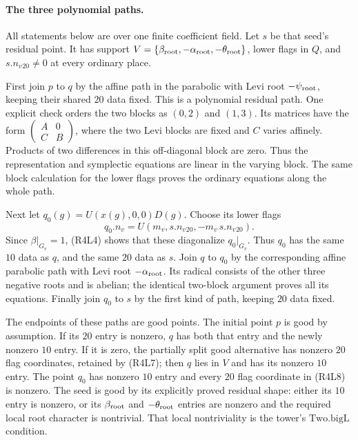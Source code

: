 \paragraph{The three polynomial paths.}
All statements below are over one finite coefficient field.
Let \(s\) be that seed's residual point.
It has support
\(V=\{\beta_{\rm root},-\alpha_{\rm root},
-\theta_{\rm root}\}\), lower flags in \(Q\), and
\(s.n_v{}_{20}\ne0\) at every ordinary place.

First join \(p\) to \(q\) by the affine path in the
parabolic with Levi root \(-\psi_{\rm root}\), keeping
their shared \(20\) data fixed.
This is a polynomial residual path.
One explicit check orders the two blocks as \((0,2)\)
and \((1,3)\). Its matrices have the form
\(\left(\begin{smallmatrix}A&0\\C&B\end{smallmatrix}\right)\),
where the two Levi blocks are fixed and \(C\) varies affinely.
Products of two differences in this off-diagonal block are
zero. Thus the representation and symplectic equations
are linear in the varying block.
The same block calculation for the lower flags proves the
ordinary equations along the whole path.

Next let \(q_0(g)=U(x(g),0,0)D(g)\).
Choose its lower flags
\[
        q_0.n_v=
          U(m_v,s.n_v{}_{20},-m_v\,s.n_v{}_{20}).           \tag{R4L8}
\]
Since \(\beta|_{G_v}=1\), (R4L4) shows that these diagonalize
\(q_0|_{G_v}\).
Thus \(q_0\) has the same \(10\) data as \(q\), and the same
\(20\) data as \(s\).
Join \(q\) to \(q_0\) by the corresponding affine
parabolic path with Levi root \(-\alpha_{\rm root}\).
Its radical consists of the other three negative roots
and is abelian; the identical two-block argument proves
all its equations.
Finally join \(q_0\) to \(s\) by the first kind of path,
keeping \(20\) data fixed.

The endpoints of these paths are good points.
The initial point \(p\) is good by assumption.
If its \(20\) entry is nonzero, \(q\) has both that entry
and the newly nonzero \(10\) entry.
If it is zero, the partially split good alternative has
nonzero \(20\) flag coordinates, retained by (R4L7);
then \(q\) lies in \(V\) and has its nonzero \(10\) entry.
The point \(q_0\) has nonzero \(10\) entry and every
\(20\) flag coordinate in (R4L8) is nonzero.
The seed is good by its explicitly proved residual shape:
either its \(10\) entry is nonzero, or its
\(\beta_{\rm root}\) and \(-\theta_{\rm root}\) entries
are nonzero and the required local root character is
nontrivial. That local nontriviality is the tower's
\(\mathrm{Two.bigL}\) condition.

